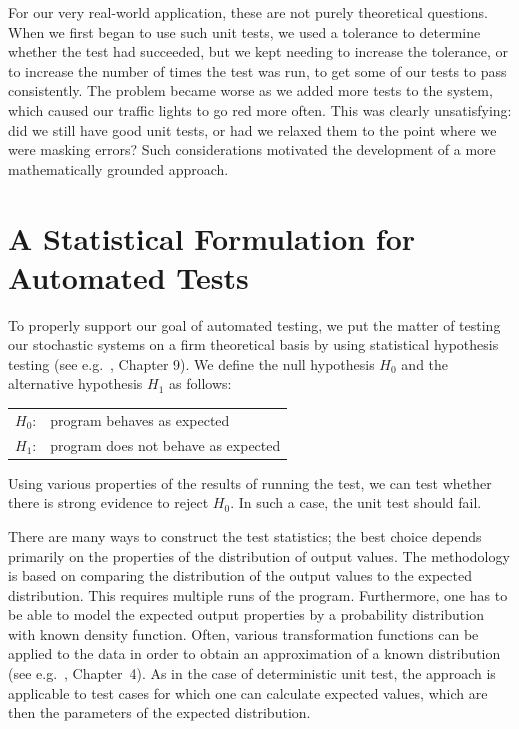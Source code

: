 \documentclass{sig-alternate}
\begin{document}
For our very real-world application, these are not purely theoretical
questions.  When we first began to use such unit tests, we used a tolerance
to determine whether the test had succeeded, but we kept needing to
increase the tolerance, or to increase the number of times the test was
run, to get some of our tests to pass consistently.  The problem became worse
as we added more tests to the system, which caused our traffic lights
to go red more often. This was clearly unsatisfying: did we still have
good unit tests, or had we relaxed them to the point where we were masking
errors?  Such considerations motivated the development of a more
mathematically grounded approach.

\section{A Statistical Formulation for Automated Tests}
\label{sec:statform}

To properly support our goal of automated testing, we put the matter
of testing our stochastic systems on a firm theoretical basis by using
statistical hypothesis testing (see e.g.\ \cite{mood-book-1974}, Chapter 9).
We define the null hypothesis $H_0$ and the alternative hypothesis
$H_1$ as follows:

\begin{tabular}{ll}
$H_0$: & program behaves as expected\\
$H_1$: & program does not behave as expected
\end{tabular}

Using various properties of the results of running the test, we can test
whether there is strong evidence to reject $H_0$. In such a case, the unit
test should fail.

There are many ways to construct the test statistics; the best choice depends
primarily on the properties of the distribution of output values.  The
methodology is based on comparing the distribution of the output values to the
expected distribution. This requires multiple runs of the program.
Furthermore, one has to be able to model the expected output properties by a
probability distribution with known density function. Often, various
transformation functions can be applied to the data in order to obtain an
approximation of a known distribution (see e.g.~\cite{Afifi&2004}, Chapter~4).
As in the case of deterministic unit test, the approach is applicable to test
cases for which one can calculate expected values, which are then the
parameters of the expected distribution.
\end{document}
